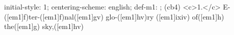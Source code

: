 initial-style: 1;
centering-scheme: english;
def-m1: \grealign;
(cb4) <c>1.</c> E-([em1]f)ter-([em1]f)nal([em1]gv) glo-([em1]hv)ry ([em1]ixiv) of([em1]h) the([em1]g) sky,([em1]hv)